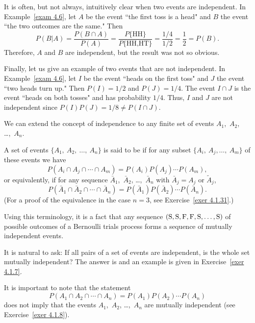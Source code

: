 \begin{example}\label{exam 4.7}
It is often, but not always, intuitively clear when two events are
independent.  In Example~\ref{exam 4.6}, let $A$ be the event ``the
first toss is a head" and $B$ the event ``the two outcomes are the same." Then
$$
P(B|A) = \frac {P(B \cap A)}{P(A)} = \frac {P\{\mbox {HH}\}}{P\{\mbox {HH,HT}\}} =
\frac {1/4}{1/2} = \frac 12 = P(B).
$$
Therefore, $A$ and $B$ are independent, but the result was not so obvious.
\end{example}

\begin{example}\label{exam 4.8}
Finally, let us give an example of two events that are not independent. 
In Example~\ref{exam 4.6}, let $I$ be the event ``heads on the first toss" and $J$
the event ``two heads turn up."  Then $P(I) = 1/2$ and $P(J) = 1/4$.  The event
$I \cap J$ is the event ``heads on both tosses" and has probability $1/4$. 
Thus, $I$ and $J$ are not independent since $P(I)P(J) = 1/8 \ne P(I \cap J)$.
\end{example}

We can extend the concept of independence to any finite set of events
$A_1$,~$A_2$, \dots,~$A_n$.

\begin{definition}\label{def 4.3}
A set of events $\{A_1,\ A_2,\ \ldots,\ A_n\}$ is said to be  if for any
subset
$\{A_i,\ A_j,\ldots,\ A_m\}$ of these events we have
$$
P(A_i \cap A_j \cap\cdots\cap A_m) = P(A_i)P(A_j)\cdots P(A_m),
$$
or equivalently, if for any sequence $\bar A_1$,~$\bar A_2$,
\dots,~$\bar A_n$ with $\bar A_j = A_j$ or $\tilde A_j$,
$$
P(\bar A_1 \cap \bar A_2 \cap\cdots\cap \bar A_n) =
P(\bar A_1)P(\bar A_2)\cdots P(\bar A_n).
$$
(For a proof of the equivalence in the case $n = 3$, 
see Exercise~\ref{exer 4.1.31}.)
\end{definition}
Using this terminology, it is a fact that any sequence  $(\mbox S,\mbox S,\mbox F,\mbox
F, \mbox S, \dots,\mbox S)$ of possible outcomes of a Bernoulli trials process forms a sequence of mutually
independent events.
\par
It is natural to ask: If all pairs of a set of events are independent, is the whole set
mutually independent?  The answer is  and an example is given in
Exercise~\ref{exer 4.1.7}.
\par
It is important to note that the statement 
$$
P(A_1 \cap A_2 \cap \cdots \cap A_n) = P(A_1)P(A_2) \cdots P(A_n)
$$
does not imply that the events $A_1$,~$A_2$, \dots,~$A_n$ are mutually independent (see
Exercise~\ref{exer 4.1.8}).

